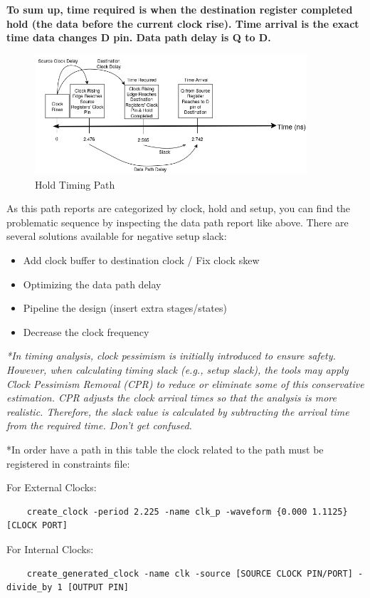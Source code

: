 \documentclass{report}
\begin{document}
\textbf{To sum up, time required is when the destination register completed hold (the data before the current clock rise). Time arrival is the exact time data changes D pin. Data path delay is Q to D.}

\begin{figure}[h!]
    \centering
    \includegraphics[width=0.9\textwidth]{images/hold_analys.png}
    \caption{Hold Timing Path}
    \label{fig:hold_timing_path}
\end{figure}


As this path reports are categorized by clock, hold and setup, you can find the problematic sequence by inspecting the data path report like above. 
There are several solutions available for negative setup slack:
\begin{itemize}
    \item Add clock buffer to destination clock / Fix clock skew
    \item Optimizing the data path delay
    \item Pipeline the design (insert extra stages/states)
    \item Decrease the clock frequency
\end{itemize}

\textit{*In timing analysis, clock pessimism is initially introduced to ensure safety. However, when calculating timing slack (e.g., setup slack), the tools may apply Clock Pessimism Removal (CPR) to reduce or eliminate some of this conservative estimation. CPR adjusts the clock arrival times so that the analysis is more realistic. Therefore, the slack value is calculated by subtracting the arrival time from the required time. Don't get confused.}

*In order have a path in this table the clock related to the path must be registered in constraints file:

For External Clocks:
\begin{verbatim}
    create_clock -period 2.225 -name clk_p -waveform {0.000 1.1125} [CLOCK PORT]
\end{verbatim}
For Internal Clocks:
\begin{verbatim}
    create_generated_clock -name clk -source [SOURCE CLOCK PIN/PORT] -divide_by 1 [OUTPUT PIN]
\end{verbatim}
\end{document}
